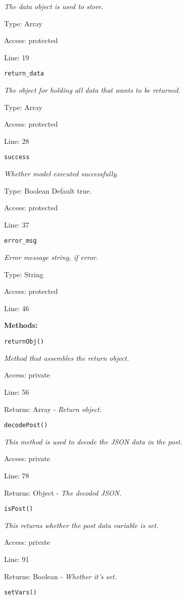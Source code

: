 {\scriptsize
\textit{The data object is used to store.}

Type: Array

Access: protected

Line: 19

}
\texttt{return\_data}

{\scriptsize
\textit{The object for holding all data that wants to be returned.}

Type: Array

Access: protected

Line: 28

}
\texttt{success}

{\scriptsize
\textit{Whether model executed successfully.}

Type: {Boolean} Default true.

Access: protected

Line: 37

}
\texttt{error\_msg}

{\scriptsize
\textit{Error message string, if error.}

Type: String

Access: protected

Line: 46

}
\textbf{Methods:}

\texttt{returnObj()}

{\scriptsize
\textit{Method that assembles the return object.}

Access: private

Line: 56

Returns: Array - \textit{Return object.}

}

\texttt{decodePost()}

{\scriptsize
\textit{This method is used to decode the JSON data in the post.}

Access: private

Line: 78

Returns: Object - \textit{The decoded JSON.}

}

\texttt{isPost()}

{\scriptsize
\textit{This returns whether the post data variable is set.}

Access: private

Line: 91

Returns: Boolean - \textit{Whether it's set.}

}

\texttt{setVars()}

